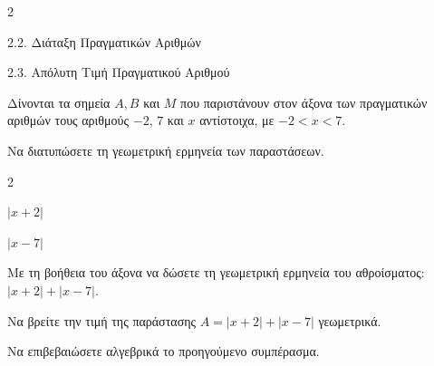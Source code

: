 \begin{ylh}{2}
    \item 2.2. Διάταξη Πραγματικών Αριθμών
    \item 2.3. Απόλυτη Τιμή Πραγματικού Αριθμού
\end{ylh}
Δίνονται τα σημεία $A,B$ και $ M $ που παριστάνουν στον άξονα των πραγματικών αριθμών τους αριθμούς $-2$, $7$ και $x$ αντίστοιχα, με $-2 < x < 7$.
\begin{alist}
\item Να διατυπώσετε τη γεωμετρική ερμηνεία των παραστάσεων.
\begin{multicols}{2}
\begin{rlist}
\item $|x + 2|$
\item $|x - 7|$
\end{rlist}
\end{multicols}
\item Με τη βοήθεια του άξονα να δώσετε τη γεωμετρική ερμηνεία του αθροίσματος:\\
$|x + 2| + |x - 7|$.
\item Να βρείτε την τιμή της παράστασης ${A} = |x + 2| + |x - 7|$ γεωμετρικά.
\item Να επιβεβαιώσετε αλγεβρικά το προηγούμενο συμπέρασμα.

\end{alist}

